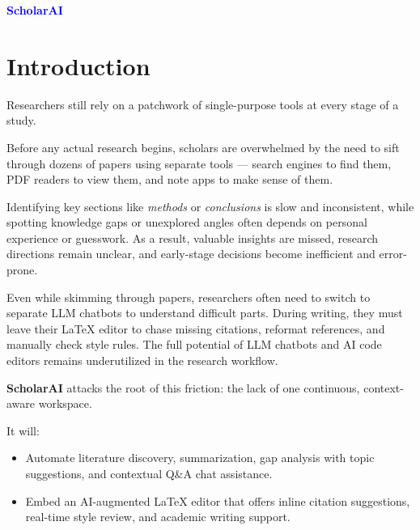 \documentclass[11pt]{article}
\begin{document}
\begin{center}
    {\fontsize{36}{44}\selectfont\bfseries\textcolor{blue}{ScholarAI}}\\[0.2em]
\end{center}

\vspace{2em}


\section*{Introduction}

\justifying
Researchers still rely on a patchwork of single-purpose tools at every stage of a study.

Before any actual research begins, scholars are overwhelmed by the need to sift through dozens of papers using separate tools — search engines to find them, PDF readers to view them, and note apps to make sense of them.

Identifying key sections like \textit{methods} or \textit{conclusions} is slow and inconsistent, while spotting knowledge gaps or unexplored angles often depends on personal experience or guesswork. As a result, valuable insights are missed, research directions remain unclear, and early-stage decisions become inefficient and error-prone.

Even while skimming through papers, researchers often need to switch to separate LLM chatbots to understand difficult parts. During writing, they must leave their LaTeX editor to chase missing citations, reformat references, and manually check style rules. The full potential of LLM chatbots and AI code editors remains underutilized in the research workflow.

\textbf{ScholarAI} attacks the root of this friction: the lack of one continuous, context-aware workspace.

It will:
\begin{itemize}
  \item Automate literature discovery, summarization, gap analysis with topic suggestions, and contextual Q\&A chat assistance.
  \item Embed an AI-augmented LaTeX editor that offers inline citation suggestions, real-time style review, and academic writing support.
\end{itemize}
\end{document}
